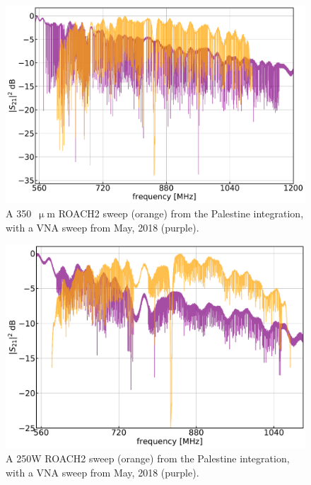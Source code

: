 \begin{figure}[!htbp]
\centering
\includegraphics[width=\textwidth]{figures/blast_data/sweeps/350_VNA_overplot}
\caption[~A  ROACH2 sweep from the Palestine integration, with a VNA sweep from May, 2018.]{A 350~$\upmu$m ROACH2 sweep (orange) from the Palestine integration, with a VNA sweep from May, 2018 (purple).}
\label{fig:VNA comp 350}
\end{figure}

\begin{figure}[!htbp]
\centering
\includegraphics[width=\textwidth]{figures/blast_data/sweeps/250W_VNA_overplot}
\caption[~A 250W ROACH2 sweep from the Palestine integration, with a VNA sweep from May, 2018.]{A 250W ROACH2 sweep (orange) from the Palestine integration, with a VNA sweep from May, 2018 (purple).}
\label{fig:VNA comp 250W}
\end{figure}


